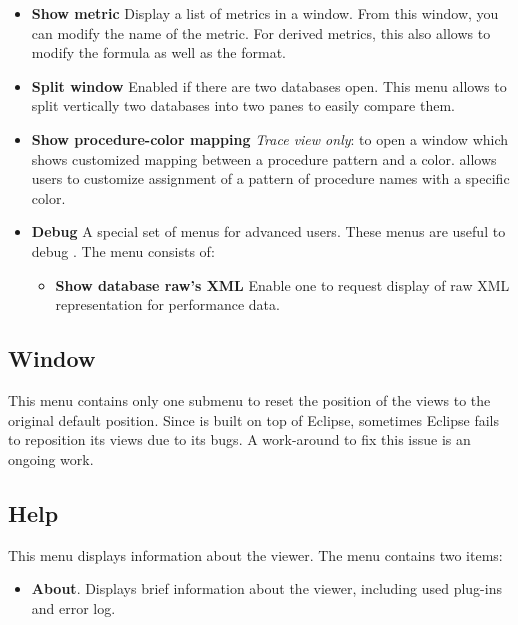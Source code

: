 \documentclass[english]{article}
\begin{document}
\begin{itemize}
 \item \textbf{Show metric}
 Display a list of metrics in a window. From this window, you can modify the name of the metric. For derived metrics, this also allows to modify the formula as well as the format.

 \item \textbf{Split window}
 Enabled if there are two databases open. This menu allows to split vertically two databases into two panes to easily compare them.

 \item \textbf{Show procedure-color mapping} \emph{Trace view only}: to open a window which shows customized mapping between a procedure pattern and a color.  allows users to customize assignment of a pattern of procedure names with a specific color.

 \item \textbf{Debug}
 A special set of menus for advanced users. These menus are useful to debug . The menu consists of:

   \begin{itemize}
     \item \textbf{Show database raw's XML}
 	Enable one to request display of raw XML representation for performance data.
  \end{itemize}

\end{itemize}

\subsection{Window}
This menu contains only one submenu to reset the position of the views to the original default position.
Since  is built on top of Eclipse, sometimes Eclipse fails to reposition its views due to its bugs.
A work-around to fix this issue is an ongoing work.


\subsection{Help}

This menu displays information about the viewer. The menu contains two items:
\begin{itemize}

\item \textbf{About}.
  Displays brief information about the viewer, including used plug-ins and error log.

\end{itemize}
\end{document}
